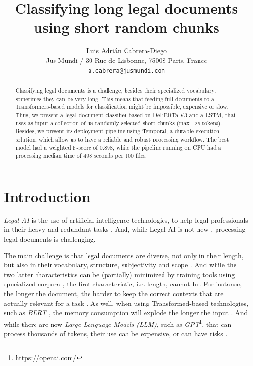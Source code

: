 \documentclass[11pt]{article}
\title{Classifying long legal documents using short random chunks}
\author{Luis Adrián Cabrera-Diego \\
  Jus Mundi / 30 Rue de Lisbonne, 75008 Paris, France \\
  \texttt{a.cabrera@jusmundi.com}}
\begin{document}
\maketitle
\begin{abstract}
    Classifying legal documents is a challenge, besides their specialized vocabulary, sometimes they can be very long. This means that feeding full documents to a Transformers-based models for classification might be impossible, expensive or slow. Thus, we present a legal document classifier  based on DeBERTa V3 and a LSTM, that uses as input a collection of 48 randomly-selected short chunks (max 128 tokens). Besides, we present its deployment pipeline using Temporal, a durable execution solution, which allow us to have a reliable and robust processing workflow. The best model had a weighted F-score of 0.898, while the pipeline running on CPU had a processing median time of 498 seconds per 100 files.
\end{abstract}

\section{Introduction}

    \textit{Legal AI} is the use of artificial intelligence technologies, to help legal professionals in their heavy and redundant tasks \cite{zhong-etal-2020-nlp}. And, while Legal AI is not new \cite{dale_law_2019}, processing legal documents is challenging.
    
    The main challenge is that legal documents are diverse, not only in their length, but also in their vocabulary, structure, subjectivity and scope \cite{mitchell_document_2014, trautmann_large_2023}. And while the two latter characteristics can be (partially) minimized by training tools using specialized corpora \cite{chalkidis_legal-bert_2020}, the first characteristic, i.e. length, cannot be. For instance, the longer the document, the harder to keep the correct contexts that are actually relevant for a task \cite{wagh_comparative_2021}. As well, when using Transformed-based technologies, such as \textit{BERT} \cite{devlin_bert_2019}, the memory consumption will explode the longer the input \cite{vaswani_attention_2017}. And while there are now \textit{Large Language Models (LLM)}, such as \textit{GPT}\footnote{https://openai.com/}, that can process thousands of tokens, their use can be expensive, or can have risks \cite{karla_grossenbacher_employers_2023,cassandre_coyer_legal_2024,fields_survey_2024}.
\end{document}
